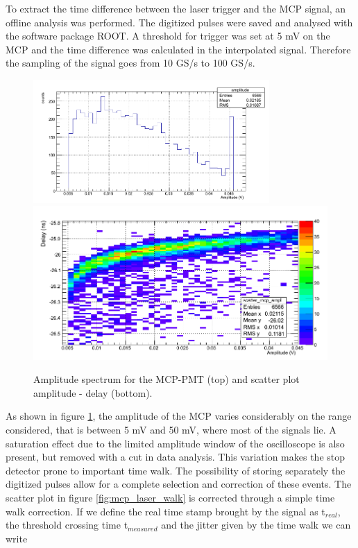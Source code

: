 To extract the time difference between the laser trigger and the MCP signal, an offline analysis was performed. The digitized pulses were saved and analysed with the software package ROOT. A threshold for trigger was set at 5 mV on the MCP and the time difference was calculated in the interpolated signal. Therefore the sampling of the signal goes from 10 GS/s to 100 GS/s. 
\begin{figure}[htbp]
\begin{center}
\includegraphics[width=9cm]{../Pictures/Chapter_8/amp_MCP.png}
\includegraphics[width=12cm]{../Pictures/Chapter_8/time_walk_mcp.png}
\end{center}
\caption[Time walk of the MCP-PMT]{Amplitude spectrum for the MCP-PMT (top) and scatter plot amplitude - delay (bottom).}
\label{fig:mcp_laser}
\end{figure}
As shown in figure \ref{fig:mcp_laser}, the amplitude of the MCP varies considerably on the range considered, that is between 5 mV and 50 mV, where most of the signals lie. A saturation effect due to the limited amplitude window of the oscilloscope is also present, but removed with a cut in data analysis. This variation makes the stop detector prone to important time walk. 
The possibility of storing separately the digitized pulses allow for a complete selection and correction of these events. The scatter plot in figure \ref{fig:mcp_laser_walk} is corrected through a simple time walk correction.
If we define the real time stamp brought by the signal as t$_{real}$, the threshold crossing time t$_{measured}$ and the jitter given by the time walk we can write
